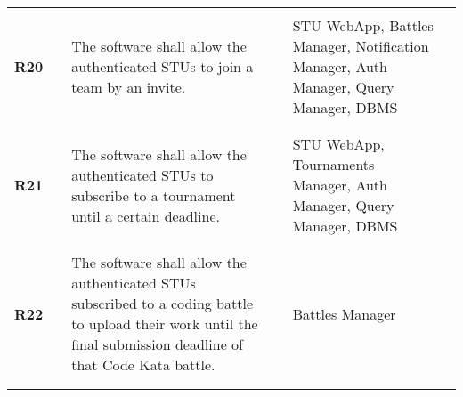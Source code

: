 \begin{longtable}[H]{l l p{6cm} l p{4cm} l}
                            &        &                                                                                                                                                                                                                                                                              &        &       \\\hline  & & \\ 
    \textbf{R20}            & \vline & The software shall allow the authenticated STUs to join a team by an invite.                                                                                                                                                                                                 & \vline &  STU WebApp, Battles Manager, Notification Manager, Auth Manager, Query Manager, DBMS\\          
                            &        &                                                                                                                                                                                                                                                                              &        &       \\\hline  & & \\ 
    \textbf{R21}            & \vline & The software shall allow the authenticated STUs to subscribe to a tournament until a certain deadline.                                                                                                                                                                       & \vline &  STU WebApp, Tournaments Manager, Auth Manager, Query Manager, DBMS \\          
                            &        &                                                                                                                                                                                                                                                                              &        &       \\\hline  & & \\ 
    \textbf{R22}            & \vline & The software shall allow the authenticated STUs subscribed to a coding battle to upload their work until the final submission deadline of that Code Kata battle.                                                                                                             & \vline &  Battles Manager \\          
                            &        &                                                                                                                                                                                                                                                                              &        &       \\\hline  & & \\ 

\end{longtable}
